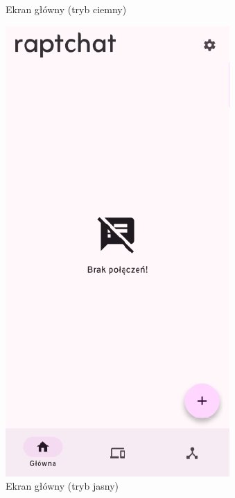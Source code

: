 \begin{figure}[H]
\begin{minipage}[b]{0.45\textwidth}
		\caption{Ekran główny (tryb ciemny)}
	\end{minipage}
	\hfill
	\begin{minipage}[b]{0.45\textwidth}
		\centering
		\includegraphics[width=\textwidth]{root/raptchat_home.png}
		\caption{Ekran główny (tryb jasny)}
	\end{minipage}
\end{figure}

